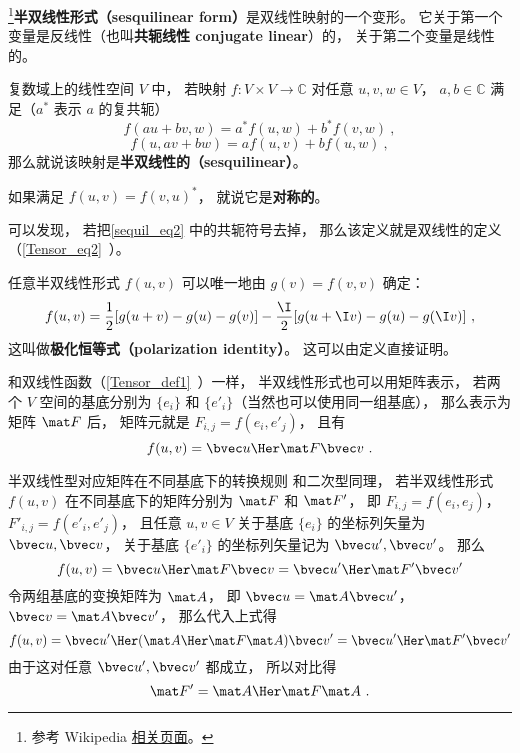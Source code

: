 
\begin{issues}
\issueDraft
\end{issues}

\footnote{参考 Wikipedia \href{https://en.wikipedia.org/wiki/Sesquilinear_form}{相关页面}。}\textbf{半双线性形式（sesquilinear form）}是双线性映射的一个变形。 它关于第一个变量是反线性（也叫\textbf{共轭线性 conjugate linear}）的， 关于第二个变量是线性的。
\begin{definition}{}\label{sequil_def1}
复数域上的线性空间 $V$ 中， 若映射 $f:V\times V\to \mathbb C$ 对任意 $u, v, w\in V$， $a,b\in \mathbb C$ 满足（$a^*$ 表示 $a$ 的复共轭）
\begin{equation}\label{sequil_eq2}
f(au+bv, w) = a^*f(u, w) + b^*f(v, w)~,
\end{equation}
\begin{equation}\label{sequil_eq1}
f(u, av+bw) = af(u, v) + bf(u, w)~,
\end{equation}
那么就说该映射是\textbf{半双线性的（sesquilinear）}。
\end{definition}
如果满足 $f(u, v) = f(v, u)^*$， 就说它是\textbf{对称的}。

可以发现， 若把\autoref{sequil_eq2} 中的共轭符号去掉， 那么该定义就是双线性的定义（\autoref{Tensor_eq2}~）。

任意半双线性形式 $f(u, v)$ 可以唯一地由 $g(v) = f(v, v)$ 确定：
\begin{equation}
f(u, v) =\frac{1}{2}[g(u+v)-g(u)-g(v)]
-\frac{\I}{2}[g(u+\I v)-g(u)-g(\I v)]~,
\end{equation}
这叫做\textbf{极化恒等式（polarization identity）}。 这可以由定义直接证明。

和双线性函数（\autoref{Tensor_def1}~）一样， 半双线性形式也可以用矩阵表示， 若两个 $V$ 空间的基底分别为 $\{e_i\}$ 和 $\{e'_i\}$（当然也可以使用同一组基底）， 那么表示为矩阵 $\mat F$ 后， 矩阵元就是 $F_{i,j} = f(e_i, e'_j)$， 且有
\begin{equation}
f(u, v) = \bvec u\Her \mat F \bvec v~.
\end{equation}

\begin{example}{半双线性型对应矩阵在不同基底下的转换规则}\label{sequil_ex1}
和二次型同理， 若半双线性形式 $f(u, v)$ 在不同基底下的矩阵分别为 $\mat F$ 和 $\mat F'$， 即 $F_{i,j} = f(e_i, e_j)$， $F'_{i,j} = f(e'_i, e'_j)$， 且任意 $u, v\in V$ 关于基底 $\{e_i\}$ 的坐标列矢量为 $\bvec u, \bvec v$， 关于基底 $\{e'_i\}$ 的坐标列矢量记为 $\bvec u', \bvec v'$。 那么
\begin{equation}
f(u, v) = \bvec u\Her \mat F \bvec v = {\bvec u'}\Her \mat F' \bvec v'
\end{equation}
令两组基底的变换矩阵为 $\mat A$， 即 $\bvec u = \mat A\bvec u'$， $\bvec v = \mat A \bvec v'$， 那么代入上式得
\begin{equation}
f(u, v) = {\bvec u'}\Her (\mat A\Her \mat F \mat A) \bvec v' = {\bvec u'}\Her \mat F' \bvec v'
\end{equation}
由于这对任意 $\bvec u', \bvec v'$ 都成立， 所以对比得
\begin{equation}
\mat F' = \mat A\Her \mat F \mat A~.
\end{equation}
\end{example}
